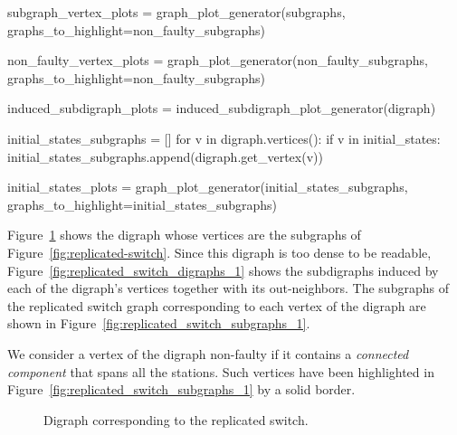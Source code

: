 \documentclass[times,a4paper,10pt,twocolumn]{article}
\theoremstyle{definition}
\theoremstyle{definition}
\theoremstyle{plain}
\begin{document}
\begin{sagesilent}
subgraph_vertex_plots = graph_plot_generator(subgraphs,
    graphs_to_highlight=non_faulty_subgraphs)

non_faulty_vertex_plots = graph_plot_generator(non_faulty_subgraphs,
    graphs_to_highlight=non_faulty_subgraphs)

induced_subdigraph_plots = induced_subdigraph_plot_generator(digraph)

initial_states_subgraphs = []
for v in digraph.vertices():
    if v in initial_states:
        initial_states_subgraphs.append(digraph.get_vertex(v))

initial_states_plots = graph_plot_generator(initial_states_subgraphs,
    graphs_to_highlight=initial_states_subgraphs)


\end{sagesilent}

Figure~\ref{fig:replicated-switch-digraph} shows the digraph whose vertices are
the subgraphs of Figure~\ref{fig:replicated-switch}. Since this digraph is too
dense to be readable, Figure~\ref{fig:replicated_switch_digraphs_1} shows the
subdigraphs induced by each of the digraph's vertices together with its
out-neighbors. The subgraphs of the replicated switch graph corresponding to
each vertex of the digraph are shown in
Figure~\ref{fig:replicated_switch_subgraphs_1}.

We consider a vertex of the digraph non-faulty if it contains a \emph{connected
component} that spans all the stations. Such vertices have been highlighted in
Figure~\ref{fig:replicated_switch_subgraphs_1} by a solid border.


\begin{figure}
\centering
{}
\caption{Digraph corresponding to the replicated switch.}
\label{fig:replicated-switch-digraph}
\end{figure}



\end{document}
